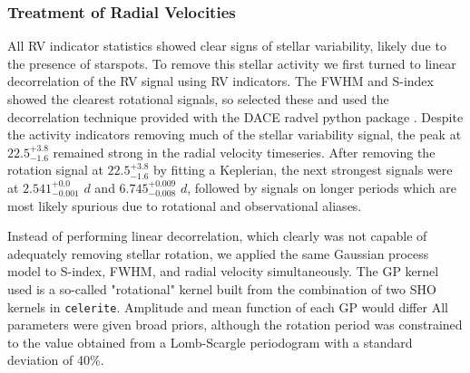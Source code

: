 \documentclass[fleqn,usenatbib]{mnras}
\newcommand{\TPzero}{ $ 2.541^{+0.0}_{-0.001} $ }
\newcommand{\TPone}{ $ 6.745^{+0.009}_{-0.008} $ }
\newcommand{\Tperiod}{ $ 22.5^{+3.8}_{-1.6} $ }
\newcommand{\TSindexperiod}{ $ 39.0 \pm 11.0 $ }
\begin{document}
\subsubsection{Treatment of Radial Velocities}
All RV indicator statistics showed clear signs of stellar variability, likely due to the presence of starspots.
To remove this stellar activity we first turned to linear decorrelation of the RV signal using RV indicators.
The FWHM and S-index showed the clearest rotational signals, so selected these and used the decorrelation technique provided with the DACE radvel python package \citep{2015ASPC..495....7B}.
Despite the activity indicators removing much of the stellar variability signal, the peak at \Tperiod remained strong in the radial velocity timeseries.
After removing the rotation signal at \Tperiod by fitting a Keplerian, the next strongest signals were at \TPzero$d$ and \TPone$d$, followed by signals on longer periods which are most likely spurious due to rotational and observational aliases.

Instead of performing linear decorrelation, which clearly was not capable of adequately removing stellar rotation, we applied the same Gaussian process model to S-index, FWHM, and radial velocity simultaneously. 
The GP kernel used is a so-called "rotational" kernel built from the combination of two SHO kernels in \texttt{celerite}.
Amplitude and mean function of each GP would differ
All parameters were given broad priors, although the rotation period was constrained to the value obtained from a Lomb-Scargle periodogram with a standard deviation of 40\%.

\end{document}
